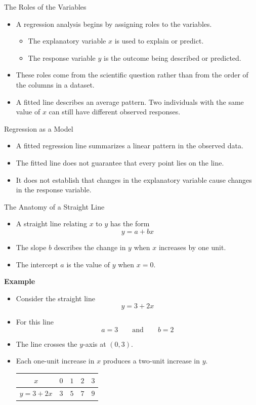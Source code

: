 \documentclass[aspectratio=169]{beamer}
\begin{document}
\begin{frame}{The Roles of the Variables}
\begin{itemize}
	\item A regression analysis begins by assigning roles to the variables.
	\begin{itemize}
		  \item The explanatory variable $x$ is used to explain or predict.
 		 \item The response variable $y$ is the outcome being described or predicted.
	\end{itemize}
	\item These roles come from the scientific question rather than from the order of the columns in a dataset.
	\item A fitted line describes an average pattern. Two individuals with the same value of $x$ can still have different observed responses.
\end{itemize}
\end{frame}

\begin{frame}{Regression as a Model}
\begin{itemize}
	\item A fitted regression line summarizes a linear pattern in the observed data.
	\item The fitted line does not guarantee that every point lies on the line. 
	\item It does not establish that changes in the explanatory variable cause changes in the response variable.
\end{itemize}
\end{frame}

\begin{frame}{The Anatomy of a Straight Line}
\begin{itemize}
	\item A straight line relating $x$ to $y$ has the form
	$$y=a+bx$$
	\item The slope $b$ describes the change in $y$ when $x$ increases by one unit.
	\item The intercept $a$ is the value of $y$ when $x=0$.
\end{itemize}

\textbf{Example}
\begin{itemize}
	\item Consider the straight line
	$$y=3+2x$$
	\item For this line
	$$a=3 \qquad\text{and}\qquad b=2$$
	\item The line crosses the $y$-axis at $(0,3)$.
	\item Each one-unit increase in $x$ produces a two-unit increase in $y$.
	\begin{center}
	\begin{tabular}{c|cccc}
	$x$ & $0$ & $1$ & $2$ & $3$ \\
	\hline
	$y=3+2x$ & $3$ & $5$ & $7$ & $9$
	\end{tabular}
	\end{center}
\end{itemize}
\end{frame}
\end{document}
